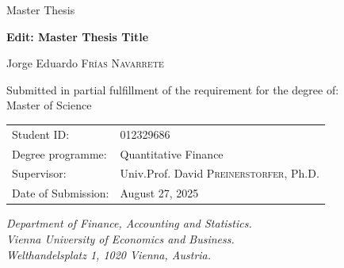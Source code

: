\documentclass[
  12pt,
  a4paper,
  openany]{scrbook}
\begin{document}
\begin{center}
    \large Master Thesis \\
    \vspace{1cm}

    \textbf{\huge Edit: Master Thesis Title} \\
    \vspace{0.5cm}

        \LARGE Jorge Eduardo \textsc{Frías Navarrete} \\
    \vspace{0.5cm}
        \vspace{2cm}
    
    \normalsize Submitted in partial fulfillment of the requirement for the degree of: \\
    \LARGE Master of Science \\
\vspace{2cm}

\normalsize
    \begin{tabular}{ll}
        Student ID: & 012329686 \\
        Degree programme: & Quantitative Finance \\
        Supervisor: & Univ.Prof. David \textsc{Preinerstorfer}, Ph.D. \\
        Date of Submission: & August 27, 2025
    \end{tabular}
    \vspace{2cm}
    
    \textit{
      Department of Finance, Accounting and Statistics. \\
      Vienna University of Economics and Business. \\
      Welthandelsplatz 1, 1020 Vienna, Austria.
    }

\end{center}

\restoregeometry


% 
\end{document}
